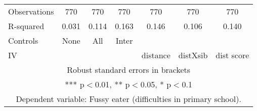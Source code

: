 \begin{tabular}{lcccccc}
Observations & 770 & 770 & 770 & 770 & 770 & 770 \\
R-squared & 0.031 & 0.114 & 0.163 & 0.146 & 0.106 & 0.140 \\
Controls & None & All & Inter &  &  &  \\
 IV &  &  &  & distance & distXsib & dist score \\ \hline
\multicolumn{7}{c}{ Robust standard errors in brackets} \\
\multicolumn{7}{c}{ *** p$<$0.01, ** p$<$0.05, * p$<$0.1} \\
\multicolumn{7}{c}{ Dependent variable: Fussy eater (difficulties in primary school).} \\
\end{tabular}
